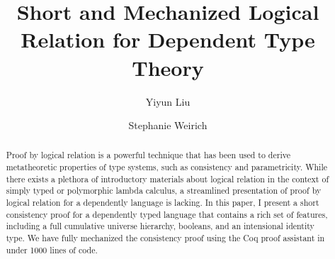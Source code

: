 \documentclass[acmsmall,screen=true,
\ifpublic review=false\else,review=true\fi
  ,anonymous=\ifanonymous true\else false\fi]{acmart}
\begin{document}
\title{Short and Mechanized Logical Relation for Dependent Type Theory}

\author{Yiyun Liu}

\author{Stephanie Weirich}


\begin{abstract}
Proof by logical relation is a powerful technique that has been used
to derive metatheoretic properties of type systems, such as
consistency and parametricity. While there exists a
plethora of introductory materials about logical relation in the
context of simply typed or polymorphic lambda calculus, a streamlined
presentation of proof by logical relation for a dependently language
is lacking. In this paper, I present a short
consistency proof for a dependently typed language that contains a
rich set of features, including a full cumulative universe
hierarchy, booleans, and an intensional identity type. We have
fully mechanized the consistency proof using the Coq proof assistant
in under 1000 lines of code.
\end{abstract}

\end{document}
